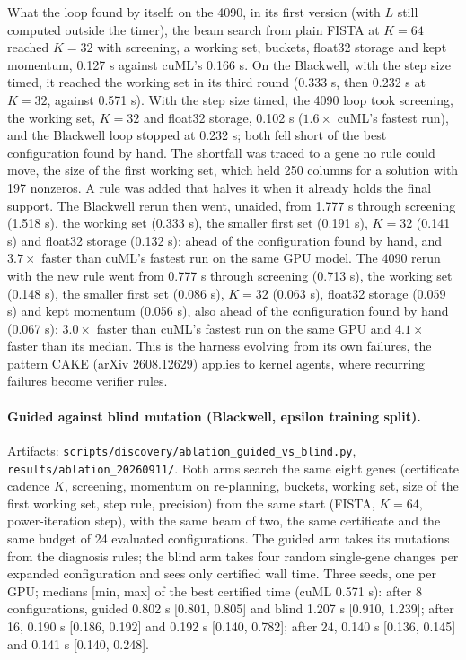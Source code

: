 What the loop found by itself: on the 4090, in its first version (with $L$
still computed outside the timer), the beam search from plain FISTA at $K=64$
reached $K=32$ with screening, a working set, buckets, float32 storage and
kept momentum, 0.127 s against cuML's 0.166 s. On the Blackwell, with the step
size timed, it reached the working set in its third round (0.333 s, then 0.232 s
at $K=32$, against 0.571 s). With the step size timed, the 4090 loop took screening, the working set,
$K=32$ and float32 storage, 0.102 s ($1.6\times$ cuML's fastest run), and the
Blackwell loop stopped at 0.232 s; both fell short of the best configuration
found by hand. The shortfall was traced to a gene no rule could move, the size
of the first working set, which held 250 columns for a solution with 197
nonzeros. A rule was added that halves it when it already holds the final
support. The Blackwell rerun then went, unaided, from 1.777 s through screening
(1.518 s), the working set (0.333 s), the smaller first set (0.191 s), $K=32$
(0.141 s) and float32 storage (0.132 s): ahead of the configuration found by
hand, and $3.7\times$ faster than cuML's fastest run on the same GPU model. The
4090 rerun with the new rule went from 0.777 s through screening (0.713 s), the
working set (0.148 s), the smaller first set (0.086 s), $K=32$ (0.063 s), float32
storage (0.059 s) and kept momentum (0.056 s), also ahead of the configuration
found by hand (0.067 s): $3.0\times$ faster than cuML's fastest run on the same GPU
and $4.1\times$ faster than its median. This is the harness evolving from
its own failures, the pattern CAKE (arXiv 2608.12629) applies to kernel agents,
where recurring failures become verifier rules.

\paragraph{Guided against blind mutation (Blackwell, epsilon training split).}
Artifacts: \texttt{scripts/discovery/ablation\_guided\_vs\_blind.py},
\texttt{results/ablation\_20260911/}. Both arms search the same eight genes
(certificate cadence $K$, screening, momentum on re-planning, buckets, working
set, size of the first working set, step rule, precision) from the same start
(FISTA, $K=64$, power-iteration step), with the same beam of two, the same
certificate and the same budget of 24 evaluated configurations. The guided arm
takes its mutations from the diagnosis rules; the blind arm takes four random
single-gene changes per expanded configuration and sees only certified wall
time. Three seeds, one per GPU; medians [min, max] of the best certified time
(cuML 0.571 s): after 8 configurations, guided 0.802 s [0.801, 0.805] and blind
1.207 s [0.910, 1.239]; after 16, 0.190 s [0.186, 0.192] and 0.192 s [0.140,
0.782]; after 24, 0.140 s [0.136, 0.145] and 0.141 s [0.140, 0.248].

